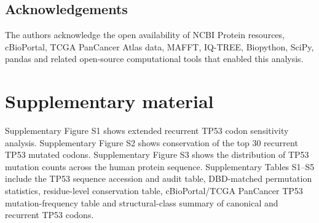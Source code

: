 \documentclass[namedate,webpdf,contemporary,large]{oup-authoring-template}
\begin{document}
\subsection{Acknowledgements}
The authors acknowledge the open availability of NCBI Protein resources, cBioPortal, TCGA PanCancer Atlas data, MAFFT, IQ-TREE, Biopython, SciPy, pandas and related open-source computational tools that enabled this analysis.

\section{Supplementary material}
Supplementary Figure S1 shows extended recurrent TP53 codon sensitivity analysis. Supplementary Figure S2 shows conservation of the top 30 recurrent TP53 mutated codons. Supplementary Figure S3 shows the distribution of TP53 mutation counts across the human protein sequence. Supplementary Tables S1--S5 include the TP53 sequence accession and audit table, DBD-matched permutation statistics, residue-level conservation table, cBioPortal/TCGA PanCancer TP53 mutation-frequency table and structural-class summary of canonical and recurrent TP53 codons.



\end{document}
